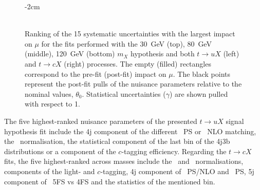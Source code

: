 \begin{figure}[htb]
    \RawFloats
    \addtolength{\leftskip} {-2cm} %
    \addtolength{\rightskip}{-2cm}
    \centering
    \\
    \\
    \caption{Ranking of the 15 systematic uncertainties with the largest impact on $\mu$ for the fits performed with the 30~GeV (top), 80~GeV (middle), 120~GeV (bottom) $m_X$ hypothesis and both $t\to uX$ (left) and $t\to cX$ (right) processes. The empty (filled) rectangles correspond  to the pre-fit (post-fit) impact on $\mu$. The black points represent the post-fit pulls of the nuisance parameters relative to the nominal values, $\theta_0$. Statistical uncertainties ($\gamma$) are shown pulled with respect to 1.
    }
    \label{tqX:ranking3080120}
\end{figure}

The five highest-ranked nuisance parameters of the presented $t\to uX$ signal hypothesis fit include the 4j component of the different \ttjets\ PS or \ttl\ NLO matching, the \ttc\ normalisation, the statistical component of the last bin of the 4j3b distributions or a component of the $c$-tagging efficiency. Regarding the $t\to cX$ fits, the five highest-ranked across masses include the \ttb\ and \ttc\ normalisations, components of the light- and $c$-tagging, 4j component of \ttb\ PS/NLO and \ttl\ PS, 5j component of \ttb\ 5FS vs 4FS and the statistics of the mentioned bin.\\


